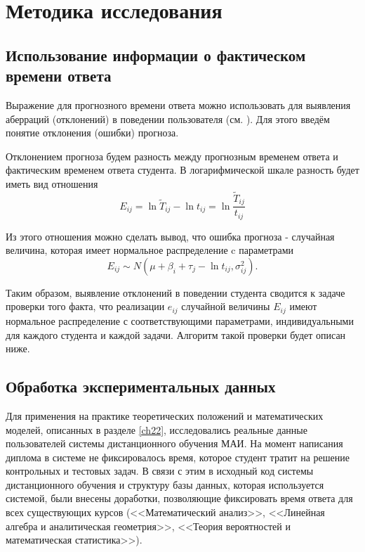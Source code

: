  \section{Методика исследования}

 \subsection{Использование информации о фактическом времени ответа}

Выражение для прогнозного времени ответа можно использовать для вы\-явления абер\-раций (отклонений) в поведении пользователя (см. \cite{6.}). Для этого введём понятие отклонения (ошибки) прогноза.

Отклонением прогноза будем разность между прогнозным временем ответа и фактичес\-ким временем ответа студента. В логарифмической шкале разность будет иметь вид отноше\-ния
\begin{equation}
E_{ij} = \ln \tilde{T}_{ij} - \ln t_{ij} =  \ln \frac{\tilde{T}_{ij}}{t_{ij}}
\end{equation}

Из этого отношения можно сделать вывод, что ошибка прогноза - случайная величина, которая имеет нормальное распределение c параметрами
\begin{equation}
\label{resudal}
E_{ij} \sim N\left(\mu + \beta_i + \tau_j - \ln t_{ij},\sigma^{2}_{ij}\right).
\end{equation}

Таким образом, выявление отклонений в поведении студента сводится к задаче проверки того факта, что реализации $e_{ij}$ случайной величины $E_{ij}$ имеют нормаль\-ное распределение с соответствующими параметрами, инди\-видуальными для каждого студента и каждой задачи. Алгоритм такой про\-верки будет описан ниже.

\subsection{Обработка экспериментальных данных}

Для применения на практике теоретических положений и математичес\-ких моделей, описанных в разделе \ref{ch22}, исследовались реальные данные пользова\-телей системы дистанцион\-ного обучения МАИ. На момент написания диплома в системе не фиксировалось время, которое студент тратит на решение конт\-рольных и тестовых задач. В связи с этим в исходный код системы дистан\-ционного обучения и структуру базы данных, которая исполь\-зуется системой, были внесены доработки, позволяющие фикси\-ровать время ответа для всех существующих курсов (<<Математический ана\-лиз>>, <<Линейная алгебра и ана\-литическая геометрия>>, <<Теория вероятностей и математическая статистика>>).

